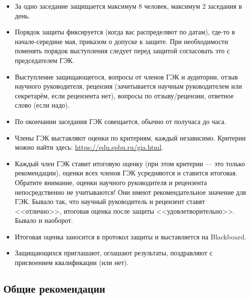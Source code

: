 \documentclass{article}
\begin{document}
\begin{itemize}
    \item За одно заседание защищается максимум 8 человек, максимум 2 заседания в день.
    \item Порядок защиты фиксируется (когда вас распределяют по датам), где-то в начале-середине мая, приказом о допуске к защите. При необходимости поменять порядок выступления следует перед защитой согласовать это с председателем ГЭК.
    \item Выступление защищающегося, вопросы от членов ГЭК и аудитории, отзыв научного руководителя, рецензия (зачитывается научным руководителем или секретарём, если рецензента нет), вопросы по отзыву/рецензии, ответное слово (если надо).
    \item По окончании заседания ГЭК совещается, обычно от получаса до часа.
    \item Члены ГЭК выставляют оценки по критериям, каждый независимо. Критерии можно найти здесь: \url{https://edu.spbu.ru/gia.html}.
    \item Каждый член ГЭК ставит итоговую оценку (при этом критерии --- это только рекомендации), оценки всех членов ГЭК усредняются и ставится итоговая. Обратите внимание, оценки научного руководителя и рецензента непосредственно не учитываются! Они имеют рекомендательное значение для ГЭК. Бывало так, что научный руководитель и рецензент ставят <<отлично>>, итоговая оценка после защиты <<удовлетворительно>>. Бывало и наоборот.
    \item Итоговая оценка заносится в протокол защиты и выставляется на Blackboard.
    \item Защищающихся приглашают, оглашают результаты, поздравляют с присвоением квалификации (или нет).
\end{itemize}

\subsection{Общие рекомендации}
\end{document}
